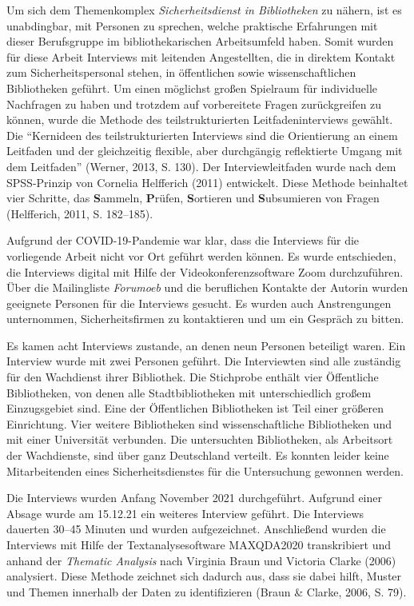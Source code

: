 \documentclass[a4paper,
fontsize=11pt,
oneside,
numbers=noperiodatend,
parskip=half-,
bibliography=totoc,
final
]{scrartcl}
\begin{document}
Um sich dem Themenkomplex \emph{Sicherheitsdienst in Bibliotheken} zu
nähern, ist es unabdingbar, mit Personen zu sprechen, welche praktische
Erfahrungen mit dieser Berufsgruppe im bibliothekarischen Arbeitsumfeld
haben. Somit wurden für diese Arbeit Interviews mit leitenden
Angestellten, die in direktem Kontakt zum Sicherheitspersonal stehen, in
öffentlichen sowie wissenschaftlichen Bibliotheken geführt. Um einen
möglichst großen Spielraum für individuelle Nachfragen zu haben und
trotzdem auf vorbereitete Fragen zurückgreifen zu können, wurde die
Methode des teilstrukturierten Leitfadeninterviews gewählt. Die
\enquote{Kernideen des teilstrukturierten Interviews sind die
Orientierung an einem Leitfaden und der gleichzeitig flexible, aber
durchgängig reflektierte Umgang mit dem Leitfaden} (Werner, 2013, S.
130). Der Interviewleitfaden wurde nach dem SPSS-Prinzip von Cornelia
Helfferich (2011) entwickelt. Diese Methode beinhaltet vier Schritte,
das \textbf{S}ammeln, \textbf{P}rüfen, \textbf{S}ortieren und
\textbf{S}ubsumieren von Fragen (Helfferich, 2011, S. 182--185).

Aufgrund der COVID-19-Pandemie war klar, dass die Interviews für die
vorliegende Arbeit nicht vor Ort geführt werden können. Es wurde
entschieden, die Interviews digital mit Hilfe der Videokonferenzsoftware
Zoom durchzuführen. Über die Mailingliste \emph{Forumoeb} und die
beruflichen Kontakte der Autorin wurden geeignete Personen für die
Interviews gesucht. Es wurden auch Anstrengungen unternommen,
Sicherheitsfirmen zu kontaktieren und um ein Gespräch zu bitten.

Es kamen acht Interviews zustande, an denen neun Personen beteiligt
waren. Ein Interview wurde mit zwei Personen geführt. Die Interviewten
sind alle zuständig für den Wachdienst ihrer Bibliothek. Die Stichprobe
enthält vier Öffentliche Bibliotheken, von denen alle Stadtbibliotheken
mit unterschiedlich großem Einzugsgebiet sind. Eine der Öffentlichen
Bibliotheken ist Teil einer größeren Einrichtung. Vier weitere
Bibliotheken sind wissenschaftliche Bibliotheken und mit einer
Universität verbunden. Die untersuchten Bibliotheken, als Arbeitsort der
Wachdienste, sind über ganz Deutschland verteilt. Es konnten leider
keine Mitarbeitenden eines Sicherheitsdienstes für die Untersuchung
gewonnen werden.

Die Interviews wurden Anfang November 2021 durchgeführt. Aufgrund einer
Absage wurde am 15.12.21 ein weiteres Interview geführt. Die Interviews
dauerten 30--45 Minuten und wurden aufgezeichnet. Anschließend wurden
die Interviews mit Hilfe der Textanalysesoftware MAXQDA2020
transkribiert und anhand der \emph{Thematic Analysis} nach Virginia
Braun und Victoria Clarke (2006) analysiert. Diese Methode zeichnet sich
dadurch aus, dass sie dabei hilft, Muster und Themen innerhalb der Daten
zu identifizieren (Braun \& Clarke, 2006, S. 79).
\end{document}
